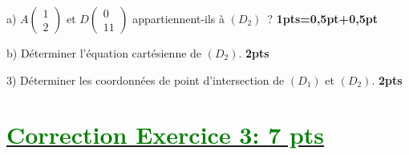 \documentclass[12pt]{article}
\begin{document}
a) $A\begin{pmatrix} 1 \\ 2\end{pmatrix}$ et $D\begin{pmatrix} 0 \\ 11\end{pmatrix}$ appartiennent-ils à $(D_{2})\;\ ?$ \textbf{1pts=0,5pt+0,5pt}

b) Déterminer l'équation cartésienne de $(D_{2})$. \textbf{2pts}

3) Déterminer les coordonnées de point d'intersection de $(D_{1})$ et $(D_{2})$. \textbf{2pts}
\section*{\underline{\textcolor{green}{Correction Exercice 3: \textbf{7 pts}}}}
\end{document}
